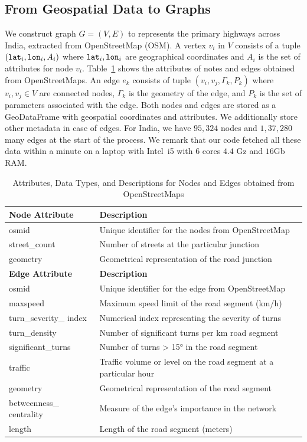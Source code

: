 \documentclass[sigplan,screen]{acmart}
\begin{document}
\subsection{From Geospatial Data to Graphs}
We construct graph $G = (V, E)$ to represents the primary highways across 
India, extracted from \textsf{OpenStreetMap (OSM)}.
A vertex $v_i$ in $V$ consists of a tuple $(\texttt{lat}_i, \texttt{lon}_i, A_i)$
where $\texttt{lat}_i, \texttt{lon}_i$ are geographical coordinates and $A_i$ is the set 
of attributes for node $v_i$.
Table~\ref{tab:nodes-attributes} shows the attributes of 
notes and edges obtained from \textsf{OpenStreetMaps}.
An edge $e_k$ consists of tuple $(v_i, v_j, \Gamma_k, P_k)$
where $v_i, v_j \in V$ are connected nodes, 
$\Gamma_k$ is the geometry 
of the edge, and 
$P_k$ is the set of parameters associated with the edge.
Both nodes and edges are stored as a \textsf{GeoDataFrame} 
with geospatial coordinates and attributes.
We additionally store other metadata in case of edges. 
For India, we have $95,324$ nodes and $1,37,280$ 
many edges at the start of the process. 
We remark that our code fetched all these data
within a minute on a laptop with Intel~i5 with $6$ cores $4.4$ Gz and
$16$Gb RAM.
 
 \begin{table}[t]
\centering
\begin{tabular}{|p{}|p{}|}
\hline
\textbf{Node Attribute} & \textbf{Description} \\ \hline
osmid & Unique identifier for the nodes from OpenStreetMap \\ \hline
street\_count  & Number of streets at the particular junction \\ \hline
geometry  & Geometrical representation of the road junction \\ \hline
\hline
\textbf{Edge Attribute}  & \textbf{Description} \\ \hline
osmid & Unique identifier for the edge from OpenStreetMap \\ \hline
maxspeed  & Maximum speed limit of the road segment (km/h) \\ \hline
turn\_severity\_ index & Numerical index representing the severity of turns \\ \hline
turn\_density  & Number of significant turns per km road segment \\ \hline
significant\_turns  & Number of turns > 15° in the road segment \\ \hline
traffic & Traffic volume or level on the road segment at a particular hour \\ \hline
geometry & Geometrical representation of the road segment \\ \hline
betweenness\_ centrality & Measure of the edge's importance in the network \\ \hline
length & Length of the road segment (meters)\\
 \hline
\end{tabular}
\caption{Attributes, Data Types, and Descriptions for Nodes and Edges
obtained from \textsf{OpenStreetMaps}}
\label{tab:nodes-attributes}
\end{table}   
 
\end{document}
